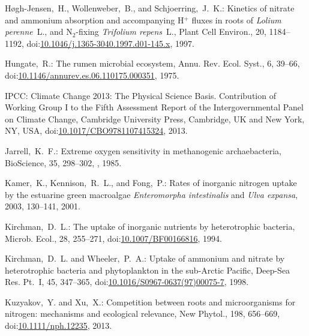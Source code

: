 \documentclass[gmd,noline]{copernicus}
\begin{document}
\begin{thebibliography}{55}
H{\o}gh-Jensen,~H., Wollenweber,~B., and Schjoerring,~J.~K.: Kinetics of
nitrate and ammonium absorption and accompanying H$^+$ fluxes in roots of
\textit{Lolium perenne}~L., and N$_2$-fixing \textit{Trifolium repens}~L.,
Plant Cell Environ., 20, 1184--1192,
doi:\href{http://dx.doi.org/10.1046/j.1365-3040.1997.d01-145.x}{10.1046/j.1365-3040.1997.d01-145.x},
1997.

Hungate,~R.: The rumen microbial ecosystem, Annu. Rev. Ecol. Syst., 6, 39--66,
doi:\href{http://dx.doi.org/10.1146/annurev.es.06.110175.000351}{10.1146/annurev.es.06.110175.000351},
1975.


IPCC:
Climate Change 2013: The Physical Science Basis. Contribution of Working Group I to the Fifth Assessment Report of the Intergovernmental Panel on Climate Change,
Cambridge University Press, Cambridge, UK and New York, NY, USA,
doi:\href{http://dx.doi.org/10.1017/CBO9781107415324}{10.1017/CBO9781107415324}, 2013.


Jarrell,~K.~F.:
Extreme oxygen sensitivity in methanogenic archaebacteria,
BioScience,
35, 298--302,
 , 1985.

Kamer,~K., Kennison,~R.~L., and Fong,~P.:
Rates of inorganic nitrogen uptake by the estuarine green macroalgae \textit{Enteromorpha intestinalis} and \textit{Ulva expansa},
2003, 130--141, 2001.


Kirchman,~D.~L.:
The uptake of inorganic nutrients by heterotrophic bacteria,
Microb. Ecol.,
28, 255--271,
doi:\href{http://dx.doi.org/10.1007/BF00166816}{10.1007/BF00166816}, 1994.


Kirchman,~D.~L. and Wheeler,~P.~A.:
Uptake of ammonium and nitrate by heterotrophic bacteria and phytoplankton in the sub-Arctic Pacific,
Deep-Sea Res. Pt.~I,
45, 347--365,
doi:\href{http://dx.doi.org/10.1016/S0967-0637(97)00075-7}{10.1016/S0967-0637(97)00075-7}, 1998.


Kuzyakov,~Y. and Xu,~X.:
Competition between roots and microorganisms for nitrogen: mechanisms and ecological relevance,
New Phytol.,
198, 656--669,
doi:\href{http://dx.doi.org/10.1111/nph.12235}{10.1111/nph.12235}, 2013.



\end{thebibliography}
\end{document}
